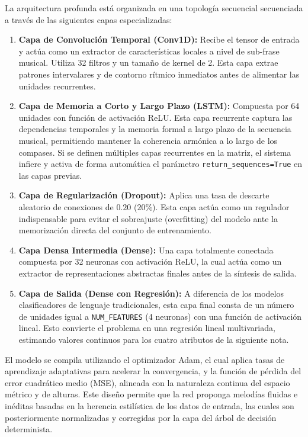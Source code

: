 \documentclass[12pt]{report}
\begin{document}
La arquitectura profunda está organizada en una topología secuencial secuenciada a través de las siguientes capas especializadas:
\begin{enumerate}
    \item \textbf{Capa de Convolución Temporal (Conv1D):} Recibe el tensor de entrada y actúa como un extractor de características locales a nivel de sub-frase musical. Utiliza 32 filtros y un tamaño de kernel de 2. Esta capa extrae patrones intervalares y de contorno rítmico inmediatos antes de alimentar las unidades recurrentes.
    \item \textbf{Capa de Memoria a Corto y Largo Plazo (LSTM):} Compuesta por 64 unidades con función de activación ReLU. Esta capa recurrente captura las dependencias temporales y la memoria formal a largo plazo de la secuencia musical, permitiendo mantener la coherencia armónica a lo largo de los compases. Si se definen múltiples capas recurrentes en la matriz, el sistema infiere y activa de forma automática el parámetro \texttt{return\_sequences=True} en las capas previas.
    \item \textbf{Capa de Regularización (Dropout):} Aplica una tasa de descarte aleatorio de conexiones de $0.20$ ($20\%$). Esta capa actúa como un regulador indispensable para evitar el sobreajuste (overfitting) del modelo ante la memorización directa del conjunto de entrenamiento.
    \item \textbf{Capa Densa Intermedia (Dense):} Una capa totalmente conectada compuesta por 32 neuronas con activación ReLU, la cual actúa como un extractor de representaciones abstractas finales antes de la síntesis de salida.
    \item \textbf{Capa de Salida (Dense con Regresión):} A diferencia de los modelos clasificadores de lenguaje tradicionales, esta capa final consta de un número de unidades igual a \texttt{NUM\_FEATURES} (4 neuronas) con una función de activación lineal. Esto convierte el problema en una regresión lineal multivariada, estimando valores continuos para los cuatro atributos de la siguiente nota.
\end{enumerate}

El modelo se compila utilizando el optimizador Adam, el cual aplica tasas de aprendizaje adaptativas para acelerar la convergencia, y la función de pérdida del error cuadrático medio (MSE), alineada con la naturaleza continua del espacio métrico y de alturas. Este diseño permite que la red proponga melodías fluidas e inéditas basadas en la herencia estilística de los datos de entrada, las cuales son posteriormente normalizadas y corregidas por la capa del árbol de decisión determinista.
\end{document}
